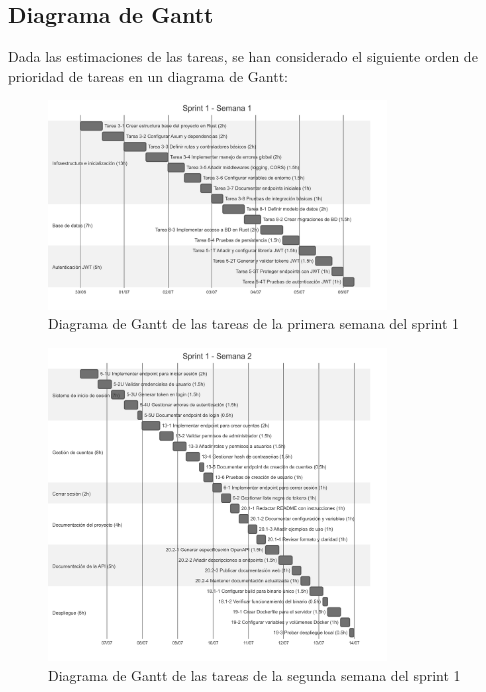 \subsection{Diagrama de Gantt}
Dada las estimaciones de las tareas, se han considerado el siguiente orden de prioridad de tareas en un diagrama de Gantt:
\begin{figure}[H]
    \begin{center}
        \includegraphics[width=0.8\textwidth]{assets/sprint1/sprint1-week1.png}
    \end{center}
    \caption{Diagrama de Gantt de las tareas de la primera semana del sprint 1}\label{fig:sprint1-week1}
\end{figure}

\begin{figure}[H]
    \begin{center}
        \includegraphics[width=0.8\textwidth]{assets/sprint1/sprint1-week2.png}
    \end{center}
    \caption{Diagrama de Gantt de las tareas de la segunda semana del sprint 1}\label{fig:sprint1-week2}
\end{figure}

